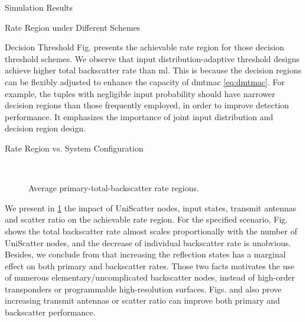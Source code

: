 \documentclass[journal]{IEEEtran}
\begin{document}
\begin{section}{Simulation Results}
\begin{subsection}{Rate Region under Different Schemes}
\begin{subsubsection}{Decision Threshold}
			Fig.  presents the achievable rate region for those decision threshold schemes.
			We observe that input distribution-adaptive threshold designs achieve higher total backscatter rate than \gls{ml}.
			This is because the decision regions can be flexibly adjusted to enhance the capacity of \gls{dmtmac} \eqref{eq:dmtmac}.
			For example, the tuples with negligible input probability should have narrower decision regions than those frequently employed, in order to improve detection performance.
			It emphasizes the importance of joint input distribution and decision region design.
		\end{subsubsection}

	\end{subsection}


	\begin{subsection}{Rate Region vs. System Configuration}
		\begin{figure}[!t]
			\centering
			\\
			\caption{Average primary-total-backscatter rate regions.}
			\label{fi:region_config_1}
		\end{figure}

		We present in \ref{fi:region_config_1} the impact of UniScatter nodes, input states, transmit antennas and scatter ratio on the achievable rate region.
		For the specified scenario, Fig.  shows the total backscatter rate almost scales proportionally with the number of UniScatter nodes, and the decrease of individual backscatter rate is unobvious.
		Besides, we conclude from  that increasing the reflection states has a marginal effect on both primary and backscatter rates.
		Those two facts motivates the use of numerous elementary/uncomplicated backscatter nodes, instead of high-order transponders or programmable high-resolution surfaces.
		Figs.  and  also prove increasing transmit antennas or scatter ratio can improve both primary and backscatter performance.


\end{subsection}
\end{section}
\end{document}
